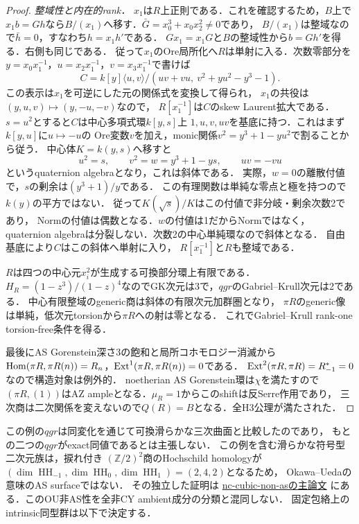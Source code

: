 \begin{proof}
\emph{整域性と内在的rank．}
$x_1$は$R$上正則である．これを確認するため，$B$上で
$x_1b=Gh$なら$B/(x_1)$へ移す．$\bar G=x_0^3+x_0x_2^2\ne0$であり，
$B/(x_1)$は整域なので$\bar h=0$，すなわち$h=x_1h'$である．
$Gx_1=x_1G$と$B$の整域性から$b=Gh'$を得る．右側も同じである．
従って$x_1$のOre局所化へ$R$は単射に入る．次数零部分を
$y=x_0x_1^{-1}$，$u=x_2x_1^{-1}$，$v=x_3x_1^{-1}$で書けば
\[
 C=k[y]\langle u,v\rangle/
 (uv+vu,\ v^2+yu^2-y^3-1).
\]
この表示は$x_1$を可逆にした元の関係式を変換して得られ，
$x_1$の共役は$(y,u,v)\mapsto(y,-u,-v)$なので，
$R[x_1^{-1}]$は$C$のskew Laurent拡大である．
$s=u^2$とすると$C$は中心多項式環$k[y,s]$上
$1,u,v,uv$を基底に持つ．これはまず$k[y,u]$に$u\mapsto-u$の
Ore変数$v$を加え，monic関係$v^2=y^3+1-yu^2$で割ることから従う．
中心体$K=k(y,s)$へ移すと
\[
 u^2=s,\qquad v^2=w=y^3+1-ys,\qquad uv=-vu
\]
というquaternion algebraとなり，これは斜体である．
実際，$w=0$の離散付値で，$s$の剰余は$(y^3+1)/y$である．
この有理関数は単純な零点と極を持つので$k(y)$の平方ではない．
従って$K(\sqrt{s})/K$はこの付値で非分岐・剰余次数2であり，
Normの付値は偶数となる．$w$の付値は1だからNormではなく，
quaternion algebraは分裂しない．次数2の中心単純環なので斜体となる．
自由基底により$C$はこの斜体へ単射に入り，
$R[x_1^{-1}]$と$R$も整域である．

$R$は四つの中心元$x_i^2$が生成する可換部分環上有限である．
$H_R=(1-z^3)/(1-z)^4$なのでGK次元は3で，$qgr$のGabriel--Krull次元は2である．
中心有限整域のgeneric商は斜体の有限次元加群圏となり，
$\pi R$のgeneric像は単純，低次元torsionから$\pi R$への射は零となる．
これでGabriel--Krull rank-one torsion-free条件を得る．

最後にAS Gorenstein深さ3の飽和と局所コホモロジー消滅から
$\operatorname{Hom}(\pi R,\pi R(n))=R_n$，$\operatorname{Ext}^1(\pi R,\pi R(n))=0$である．
$\operatorname{Ext}^2(\pi R,\pi R)=R_{-1}^*=0$なので構造対象は例外的．
noetherian AS Gorenstein環は$\chi$を満たす\cite[Corollary 4.3]{YZ}ので
$(\pi R,(1))$はAZ ampleとなる．$\mu_R=1$からこのshiftは反Serre作用であり，
三次商は二次関係を変えないので$Q(R)=B$となる．全H3公理が満たされた．
\end{proof}

この例の$qgr$は同変化を通じて可換滑らかな三次曲面と比較したのであり，
もとの二つの$qgr$がexact同値であるとは主張しない．
この例を含む滑らかな符号型二次元族は，捩れ付き
$(\mathbb Z/2)^2$商のHochschild homologyが
$(\dim\operatorname{HH}_{-1},\dim\operatorname{HH}_0,\dim\operatorname{HH}_1)=(2,4,2)$となるため，
Okawa--Uedaの意味のAS surfaceではない．
その独立した証明は
\href{https://github.com/uedakazushi/nc-cubic-non-as/blob/main/papers/nc-cubic-non-as.tex}{nc-cubic-non-asの主論文}
にある．このOU非AS性を全非CY ambient成分の分類と混同しない．
固定包絡上のintrinsic同型群は以下で決定する．

